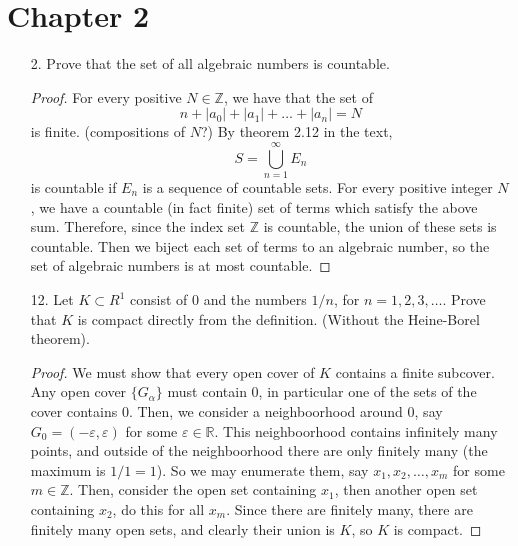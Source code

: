 \documentclass[hidelinks,12pt]{article}
\newcommand{\R}{\mathbb{R}}
\newcommand{\Z}{\mathbb{Z}}
\begin{document}
\section{Chapter 2}
\begin{enumerate}
    \item[2.] Prove that the set of all algebraic numbers is countable.
        \begin{proof}
            For every positive $N\in\Z$, we have that the set of
            \[
                n+|a_0|+|a_1|+\dots+|a_n|=N
            \]
            is finite. (compositions of $N$?) By theorem 2.12 in the text,
            \[
                S=\bigcup_{n=1}^{\infty}E_n
            \]
            is countable if $E_n$ is a sequence of countable sets. For every positive integer $N$, we have a countable (in fact finite) set of terms which satisfy the above sum. Therefore, since the index set $\Z$ is countable, the union of these sets is countable. Then we biject each set of terms to an algebraic number, so the set of algebraic numbers is at most countable.
        \end{proof}
    \item[12.] Let \(K\subset R^1\) consist of \(0\) and the numbers \(1/n\), for \(n=1,2,3,\dots\). Prove that \(K\) is compact directly from the definition. (Without the Heine-Borel theorem).  
        \begin{proof}
            We must show that every open cover of \(K\) contains a finite subcover. Any open cover \(\{G_{\alpha}\}\) must contain 0, in particular one of the sets of the cover contains 0. Then, we consider a neighboorhood around 0, say \(G_0=(-\varepsilon,\varepsilon)\) for some \(\varepsilon\in\R\). This neighboorhood contains infinitely many points, and outside of the neighboorhood there are only finitely many (the maximum is \(1/1=1\)). So we may enumerate them, say \(x_1,x_2,\dots,x_m\) for some \(m\in\Z\). Then, consider the open set containing \(x_1\), then another open set containing \(x_2\), do this for all \(x_m\). Since there are finitely many, there are finitely many open sets, and clearly their union is \(K\), so \(K\) is compact.  
        \end{proof}
\end{enumerate}
\end{document}
